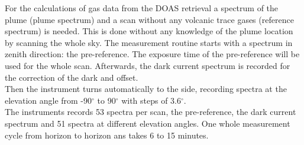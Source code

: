 		For the calculations of gas data from the DOAS retrieval a spectrum of the plume (plume spectrum) and a scan without any volcanic trace gases (reference spectrum) is needed.  This is done without any knowledge of the plume location by scanning the whole sky. 
		The measurement routine starts with a spectrum in zenith direction: the pre-reference. The exposure time of the pre-reference will be used for the whole scan.
		Afterwards, the dark current spectrum is recorded for the correction of the dark and offset.\\
		Then the instrument turns automatically to the side, recording spectra at the elevation angle from -90$^{\circ}$ to 90$^{\circ}$ with steps of 3.6$^{\circ}$. \\
		The instruments records 53 spectra per scan, the pre-reference, the dark current spectrum and 51 spectra at different elevation angles.
		One whole measurement cycle from horizon to horizon ans takes 6 to 15 minutes.